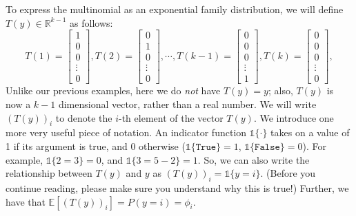 To express the multinomial as an exponential family distribution, we will
define $T(y) \in \mathbb R^{k-1}$ as follows:
\begin{equation*}
    T(1) = \begin{bmatrix}1\\0\\0\\\vdots\\0\end{bmatrix},
    T(2) = \begin{bmatrix}0\\1\\0\\\vdots\\0\end{bmatrix},
    \cdots,
    T(k-1) = \begin{bmatrix}0\\0\\0\\\vdots\\1\end{bmatrix},
    T(k) = \begin{bmatrix}0\\0\\0\\\vdots\\0\end{bmatrix},
\end{equation*}
Unlike our previous examples, here we do \textit{not} have $T(y) = y$; also, $T(y)$ is
now a $k - 1$ dimensional vector, rather than a real number. We will write
$(T(y))_i$ to denote the $i$-th element of the vector $T(y)$.
We introduce one more very useful piece of notation. An indicator function
$\mathbb{1}\{\cdot\}$ takes on a value of 1 if its argument is true, and 0 otherwise
($\mathbb{1}\{\texttt{True}\} = 1$, $\mathbb{1}\{\texttt{False}\} = 0$). For example, $\mathbb{1}\{2 = 3\} = 0$, and $\mathbb{1}\{3 =
5 - 2\} = 1$. So, we can also write the relationship between $T(y)$ and $y$ as
$(T(y))_i = \mathbb{1}\{y = i\}$. (Before you continue reading, please make sure you understand
why this is true!) Further, we have that $\mathbb E[(T(y))_i] = P(y = i) = \phi_i$.

